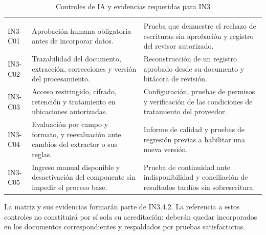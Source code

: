 \begin{longtable}{
L{\tabcolsep\relax}
L{\tabcolsep\relax}
L{\tabcolsep\relax}
}
\caption{Controles de IA y evidencias requeridas para IN3}
\label{tab:in3-controles}\\
\hline
{} &
 &
 \\
\hline
\endfirsthead
\hline
{} &
 &
 \\
\hline
\endhead

IN3-C01 &
Aprobación humana obligatoria antes de incorporar datos. &
Prueba que demuestre el rechazo de escrituras sin aprobación
y registro del revisor autorizado. \\
\hline

IN3-C02 &
Trazabilidad del documento, extracción, correcciones
y versión del procesamiento. &
Reconstrucción de un registro aprobado desde su documento
y bitácora de revisión. \\
\hline

IN3-C03 &
Acceso restringido, cifrado, retención y tratamiento
en ubicaciones autorizadas. &
Configuración, pruebas de permisos y verificación de las
condiciones de tratamiento del proveedor. \\
\hline

IN3-C04 &
Evaluación por campo y formato, y reevaluación ante cambios
del extractor o sus reglas. &
Informe de calidad y pruebas de regresión previas
a habilitar una nueva versión. \\
\hline

IN3-C05 &
Ingreso manual disponible y desactivación del componente
sin impedir el proceso base. &
Prueba de continuidad ante indisponibilidad y conciliación
de resultados tardíos sin sobrescritura. \\
\hline
\end{longtable}

La matriz y sus evidencias formarán parte de IN3.4.2.
La referencia a estos controles no constituirá por sí sola
su acreditación: deberán quedar incorporados en los documentos
correspondientes y respaldados por pruebas satisfactorias.

